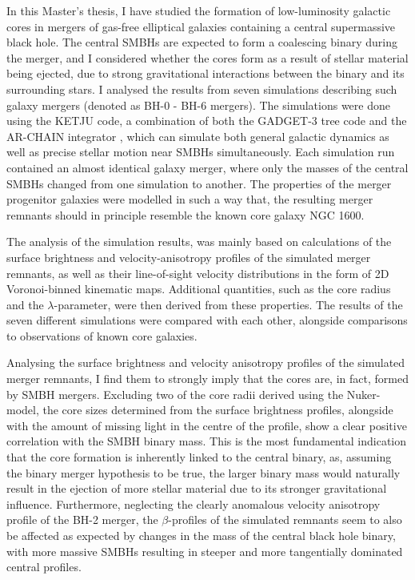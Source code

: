 \documentclass[english, twoside]{HYgradu}
\begin{document}
In this Master's thesis, I have studied the formation of low-luminosity galactic cores in mergers of gas-free elliptical galaxies containing a central supermassive black hole. The central SMBHs are expected to form a coalescing binary during the merger, and I considered whether the cores form as a result of stellar material being ejected, due to strong gravitational interactions between the binary and its surrounding stars. I analysed the results from seven simulations describing such galaxy mergers (denoted as BH-0 - BH-6 mergers). The simulations were done using the KETJU code, a combination of both the GADGET-3 tree code \citep{Springel2005} and the AR-CHAIN integrator \citep{Mikkola2008ARCHAIN}, which can simulate both general galactic dynamics as well as precise stellar motion near SMBHs simultaneously. Each simulation run contained an almost identical galaxy merger, where only the masses of the central SMBHs changed from one simulation to another. The properties of the merger progenitor galaxies were modelled in such a way that, the resulting merger remnants should in principle resemble the known core galaxy NGC 1600.

The analysis of the simulation results, was mainly based on calculations of the surface brightness and velocity-anisotropy profiles of the simulated merger remnants, as well as their line-of-sight velocity distributions in the form of 2D Voronoi-binned kinematic maps. Additional quantities, such as the core radius and the $\lambda$-parameter, were then  derived from these properties. The results of the seven different simulations were compared with each other, alongside comparisons to observations of known core galaxies.

Analysing the surface brightness and velocity anisotropy profiles of the simulated merger remnants, I find them to strongly imply that the cores are, in fact, formed by SMBH mergers. Excluding two of the core radii derived using the Nuker-model, the core sizes determined from the surface brightness profiles, alongside with the amount of missing light in the centre of the profile, show a clear positive correlation with the SMBH binary mass. This is the most fundamental indication that the core formation is inherently linked to the central binary, as, assuming the binary merger hypothesis to be true, the larger binary mass would naturally result in the ejection of more stellar material due to its stronger gravitational influence. Furthermore, neglecting the clearly anomalous velocity anisotropy profile of the BH-2 merger, the $\beta$-profiles of the simulated remnants seem to also be affected as expected by changes in the mass of the central black hole binary, with more massive SMBHs resulting in steeper and more tangentially dominated central profiles. 
\end{document}
